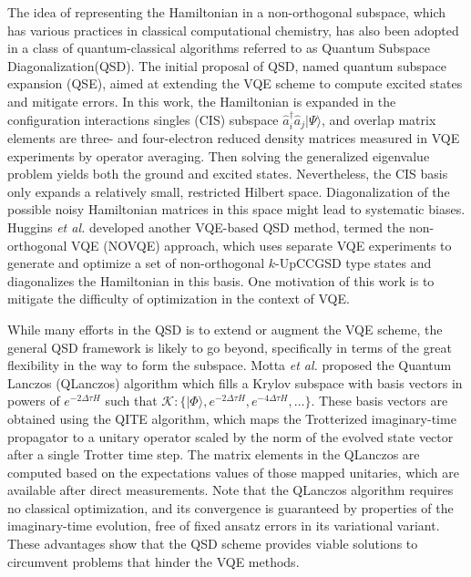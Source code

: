 \documentclass[journal=jctcce,manuscript=article]{achemso}
\newcommand{\familyname}[0]{Quantum Subspace Diagonalization\xspace}
\begin{document}
The idea of representing the Hamiltonian in a non-orthogonal subspace,\cite{ostlund1982modern} which has various practices in classical computational chemistry,\cite{Lowdin:1950tq,King:1967ev,Noodleman:1981iz,Voter:1981eu,Malmqvist:1986jh,Koch:1993tf,thom2009hartree,sundstrom2014non} has also been adopted in a class of quantum-classical algorithms referred to as \familyname (QSD).\cite{McClean:2017ct,Colless:2018hp,Motta:2019bu, Parrish:2019tc,Huggins:2019vv,Ollitrault:2019tn,Takeshita:2020dh}
The initial proposal of QSD, named quantum subspace expansion (QSE), aimed at extending the VQE scheme to compute excited states and mitigate errors.\cite{McClean:2017ct} 
In this work, the Hamiltonian is expanded in the configuration interactions singles (CIS) subspace $\hat{a}_{i}^{\dagger} \hat{a}_{j}|\Psi\rangle$, and overlap matrix elements are three- and four-electron reduced density matrices measured in VQE experiments by operator averaging.\cite{Takeshita:2020dh} Then solving the generalized eigenvalue problem yields both the ground and excited states. Nevertheless, the CIS basis only expands a relatively small, restricted Hilbert space. Diagonalization of the possible noisy Hamiltonian matrices in this space might lead to systematic biases.\cite{Blunt:2018ee}
Huggins \textit{et al.} developed another VQE-based QSD method, termed the non-orthogonal VQE (NOVQE) approach,\cite{Huggins:2019vv} which uses separate VQE experiments to generate and optimize a set of non-orthogonal $k$-UpCCGSD type states\cite{Lee:2018cy} and diagonalizes the Hamiltonian in this basis. One motivation of this work is to mitigate the difficulty of optimization in the context of VQE.

While many efforts in the QSD is to extend or augment the VQE scheme, the general QSD framework is likely to go beyond, specifically in terms of the great flexibility in the way to form the subspace. 
Motta \textit{et al.} proposed the Quantum Lanczos (QLanczos) algorithm\cite{Motta:2019bu} which fills a Krylov subspace with basis vectors in powers of $e^{-2\Delta \tau H}$ such that $\mathcal{K}: \{|\Phi \rangle, e^{-2 \Delta \tau H}, e^{-4  \Delta \tau H},…  \}$. These basis vectors are obtained using the QITE algorithm,\cite{Motta:2019bu} which maps the Trotterized imaginary-time propagator to a unitary operator scaled by the norm of the evolved state vector after a single Trotter time step. The matrix elements in the QLanczos are computed based on the expectations values of those mapped unitaries, which are available after direct measurements. Note that the QLanczos algorithm requires no classical optimization, and its convergence is guaranteed by properties of the imaginary-time evolution, free of fixed ansatz errors in its variational variant.\cite{McArdle:2019ek} These advantages show that the QSD scheme provides viable solutions to circumvent problems that hinder the VQE methods. 
\end{document}
